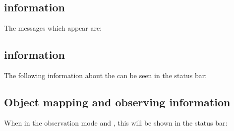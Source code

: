 
\subsection{\gdserver information}

The \gdserver messages which appear are:

\begin{gdreficon}
\end{gdreficon}


\subsection{\gdaut information}

The following information about the \gdaut can be seen in the status bar:

\begin{gdreficon}
\end{gdreficon}


\subsection{Object mapping and observing information}

When in the observation mode and \gdomm{}, this will be shown in the status bar:

\begin{gdreficon}
\end{gdreficon}


